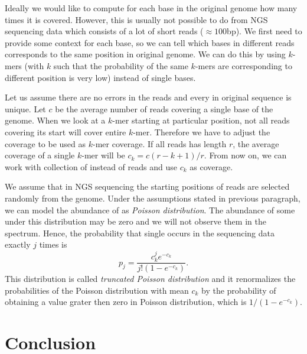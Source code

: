 Ideally we would like to compute for each base in the original genome how many times it is covered. However, this is usually not possible to do from NGS sequencing data which consists of a lot of short reads ($\approx 100$bp). We first need to provide some context for each base, so we can tell which bases in different reads corresponds to the same position in original genome. We can do this by using $k$-mers (with $k$ such that the probability of the same $k$-mers are corresponding to different position is very low)  instead of single bases.

Let us assume there are no errors in the reads and every \kmer in original sequence is unique. Let $c$ be the average number of reads covering a single base of the genome. When we look at a $k$-mer starting at particular position, not all reads covering its start will cover entire $k$-mer. Therefore we have to adjust the coverage to be used as $k$-mer coverage. If all reads has length $r$, the average coverage of a single $k$-mer will be $c_k = c (r - k + 1)/r$. From now on, we can work with collection of \kmers instead of reads and use $c_k$ as coverage.

We assume that in NGS sequencing the starting positions of reads are selected randomly from the genome.
Under the assumptions stated in previous paragraph, we can model the abundance of \kmers as \emph{Poisson distribution}. The abundance of some \kmers under this distribution may be zero and we will not observe them in the spectrum. Hence, the probability that single \kmer occurs in the sequencing data exactly $j$ times is $$p_j = \frac{c_k^j e^{-c_k}}{j! (1-e^{-c_k})}.$$
This distribution is called \emph{truncated Poisson distribution} and it renormalizes the probabilities of the Poisson distribution with mean $c_k$ by the probability of obtaining a value grater then zero in Poisson distribution, which is $1/(1-e^{-c_k})$.



%
%

\section{Conclusion}
